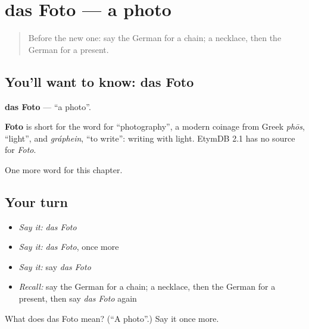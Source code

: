 \section[das Foto]{das Foto — a photo}

\label{lesson:GE-C117-foto}



\begin{quote}
Before the new one: say the German for a chain; a necklace, then the German for a present.
\end{quote}

\subsection*{You'll want to know: das Foto}
\textbf{das Foto} — \textquotedblleft{}a photo\textquotedblright{}.

\begin{cousinweb}
\textbf{Foto} is short for the word for \textquotedblleft{}photography\textquotedblright{}, a modern coinage from Greek \emph{phōs}, \textquotedblleft{}light\textquotedblright{}, and \emph{gráphein}, \textquotedblleft{}to write\textquotedblright{}: writing with light. EtymDB 2.1 has no source for \emph{Foto}.
\end{cousinweb}

\begin{grammarlens}[title={What you've built}]
One more word for this chapter.
\end{grammarlens}

\subsection*{Your turn}
\begin{itemize}
\raggedright
  \item \emph{Say it:} \emph{das Foto}
  \item \emph{Say it:} \emph{das Foto}, once more
  \item \emph{Say it:} say \emph{das Foto}
  \item \emph{Recall:} say the German for a chain; a necklace, then the German for a present, then say \emph{das Foto} again
\end{itemize}

\begin{tcolorbox}[breakable,colback=teal!4,colframe=teal!35!black,title={Before you move on}]
What does das Foto mean? (\textquotedblleft{}A photo\textquotedblright{}.) Say it once more.
\end{tcolorbox}
